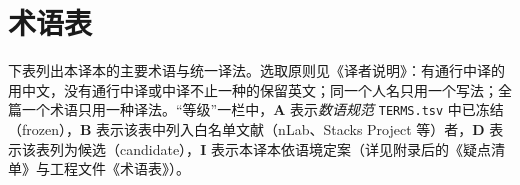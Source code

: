 
\section{术语表}\label{app:terms}

下表列出本译本的主要术语与统一译法。选取原则见《译者说明》：有通行中译的用中文，没有通行中译或中译不止一种的保留英文；同一个人名只用一个写法；全篇一个术语只用一种译法。``等级''一栏中，\textbf{A} 表示\emph{数语规范} \texttt{TERMS.tsv} 中已冻结（frozen），\textbf{B} 表示该表中列入白名单文献（nLab、Stacks Project 等）者，\textbf{D} 表示该表列为候选（candidate），\textbf{I} 表示本译本依语境定案（详见附录后的《疑点清单》与工程文件《术语表》）。

